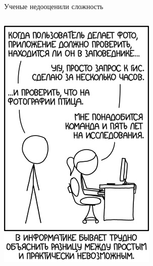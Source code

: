 \documentclass[aspectratio=169, professionalfonts]{beamer}
\begin{document}
\begin{frame}{Ученые недооценили сложность}
\begin{columns}
\begin{column}{.24\linewidth}
            \includegraphics[width=\linewidth]{figures/fig11-xkcd-gis.jpg}
        \end{column}
    \end{columns}
\end{frame}
\end{document}
